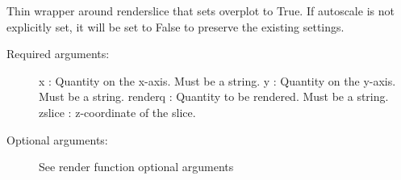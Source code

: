 \documentclass[letterpaper,10pt,english]{sphinxmanual}
\begin{document}
\begin{fulllineitems}
\label{index:facade.addrenderslice}
Thin wrapper around renderslice that sets overplot to True.  If autoscale is
not explicitly set, it will be set to False to preserve the existing settings.
\begin{description}
\item[{Required arguments:}] \leavevmode
x          : Quantity on the x-axis. Must be a string.
y          : Quantity on the y-axis. Must be a string.
renderq    : Quantity to be rendered. Must be a string.
zslice     : z-coordinate of the slice.

\item[{Optional arguments:}] \leavevmode
See render function optional arguments

\end{description}

\end{fulllineitems}

\end{document}
